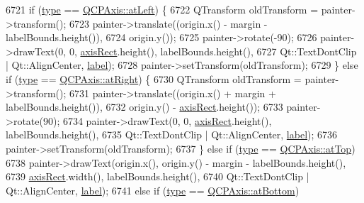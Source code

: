 \begin{DoxyCode}
6721     \textcolor{keywordflow}{if} (\hyperlink{class_q_c_p_axis_painter_private_ae04594e97417336933d807c86d353098}{type} == \hyperlink{class_q_c_p_axis_ae2bcc1728b382f10f064612b368bc18aaf84aa6cac6fb6099f54a2cbf7546b730}{QCPAxis::atLeft}) \{
6722       QTransform oldTransform = painter->transform();
6723       painter->translate((origin.x() - margin - labelBounds.height()),
6724                          origin.y());
6725       painter->rotate(-90);
6726       painter->drawText(0, 0, \hyperlink{class_q_c_p_axis_painter_private_afcd55b0e1ecd689fffd2b1fc75dc7732}{axisRect}.height(), labelBounds.height(),
6727                         Qt::TextDontClip | Qt::AlignCenter, \hyperlink{class_q_c_p_axis_painter_private_afe004c322f92543c0467afc02da6cf6d}{label});
6728       painter->setTransform(oldTransform);
6729     \} \textcolor{keywordflow}{else} \textcolor{keywordflow}{if} (\hyperlink{class_q_c_p_axis_painter_private_ae04594e97417336933d807c86d353098}{type} == \hyperlink{class_q_c_p_axis_ae2bcc1728b382f10f064612b368bc18aadf5509f7d29199ef2f263b1dd224b345}{QCPAxis::atRight}) \{
6730       QTransform oldTransform = painter->transform();
6731       painter->translate((origin.x() + margin + labelBounds.height()),
6732                          origin.y() - \hyperlink{class_q_c_p_axis_painter_private_afcd55b0e1ecd689fffd2b1fc75dc7732}{axisRect}.height());
6733       painter->rotate(90);
6734       painter->drawText(0, 0, \hyperlink{class_q_c_p_axis_painter_private_afcd55b0e1ecd689fffd2b1fc75dc7732}{axisRect}.height(), labelBounds.height(),
6735                         Qt::TextDontClip | Qt::AlignCenter, \hyperlink{class_q_c_p_axis_painter_private_afe004c322f92543c0467afc02da6cf6d}{label});
6736       painter->setTransform(oldTransform);
6737     \} \textcolor{keywordflow}{else} \textcolor{keywordflow}{if} (\hyperlink{class_q_c_p_axis_painter_private_ae04594e97417336933d807c86d353098}{type} == \hyperlink{class_q_c_p_axis_ae2bcc1728b382f10f064612b368bc18aac0ece2b680d3f545e701f75af1655977}{QCPAxis::atTop})
6738       painter->drawText(origin.x(), origin.y() - margin - labelBounds.height(),
6739                         \hyperlink{class_q_c_p_axis_painter_private_afcd55b0e1ecd689fffd2b1fc75dc7732}{axisRect}.width(), labelBounds.height(),
6740                         Qt::TextDontClip | Qt::AlignCenter, \hyperlink{class_q_c_p_axis_painter_private_afe004c322f92543c0467afc02da6cf6d}{label});
6741     \textcolor{keywordflow}{else} \textcolor{keywordflow}{if} (\hyperlink{class_q_c_p_axis_painter_private_ae04594e97417336933d807c86d353098}{type} == \hyperlink{class_q_c_p_axis_ae2bcc1728b382f10f064612b368bc18aa220d68888516b6c3b493d144f1ba438f}{QCPAxis::atBottom})

\end{DoxyCode}
